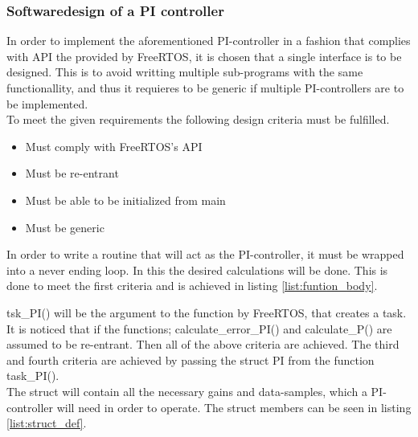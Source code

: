 \documentclass[../../../main]{subfiles}
\begin{document}
\subsubsection{Softwaredesign of a PI controller}
In order to implement the aforementioned PI-controller in a fashion that complies with API the provided by FreeRTOS, it is chosen that a single interface is to be designed.
This is to avoid writting multiple sub-programs with the same functionallity, and thus it requieres to be generic if multiple PI-controllers are to be implemented.
\\

To meet the given requirements the following design criteria must be fulfilled.

\begin{itemize}

  \item Must comply with FreeRTOS's API
  \item Must be re-entrant
  \item Must be able to be initialized from main
  \item Must be generic
\end{itemize}

In order to write a routine that will act as the PI-controller, it must be wrapped into a never ending loop.
In this the desired calculations will be done. This is done to meet the first criteria and is achieved in listing \ref{list:funtion_body}.





tsk\_PI() will be the argument to the function by FreeRTOS, that creates a task.
It is noticed that if the functions; calculate\_error\_PI() and calculate\_P() are assumed to be re-entrant. Then all of the above criteria are achieved.
The third and fourth criteria are achieved by passing the struct PI from the function task\_PI().
\\

The struct will contain all the necessary gains and data-samples, which a PI-controller will need in order to operate.
The struct members can be seen in listing \ref{list:struct_def}.

\end{document}
